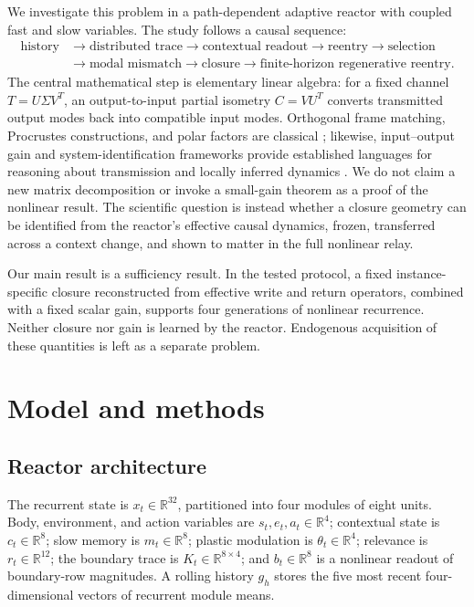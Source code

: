 \documentclass[aps,pre,preprint,superscriptaddress,nofootinbib]{revtex4-2}
\begin{document}
We investigate this problem in a path-dependent adaptive reactor with coupled fast and slow variables. The study follows a causal sequence:
\begin{equation}
\begin{aligned}
\text{history}&\rightarrow\text{distributed trace}\rightarrow\text{contextual readout}\rightarrow\text{reentry}\rightarrow\text{selection}\\
&\rightarrow\text{modal mismatch}\rightarrow\text{closure}\rightarrow\text{finite-horizon regenerative reentry}.
\end{aligned}
\end{equation}
The central mathematical step is elementary linear algebra: for a fixed channel $T=U\Sigma V^T$, an output-to-input partial isometry $C=VU^T$ converts transmitted output modes back into compatible input modes. Orthogonal frame matching, Procrustes constructions, and polar factors are classical \cite{Schonemann1966,Higham1986}; likewise, input--output gain and system-identification frameworks provide established languages for reasoning about transmission and locally inferred dynamics \cite{Zames1966,Ljung1999,Schmid2010}. We do not claim a new matrix decomposition or invoke a small-gain theorem as a proof of the nonlinear result. The scientific question is instead whether a closure geometry can be identified from the reactor's effective causal dynamics, frozen, transferred across a context change, and shown to matter in the full nonlinear relay.

Our main result is a sufficiency result. In the tested protocol, a fixed instance-specific closure reconstructed from effective write and return operators, combined with a fixed scalar gain, supports four generations of nonlinear recurrence. Neither closure nor gain is learned by the reactor. Endogenous acquisition of these quantities is left as a separate problem.

\section{Model and methods}

\subsection{Reactor architecture}

The recurrent state is $x_t\in\mathbb{R}^{32}$, partitioned into four modules of eight units. Body, environment, and action variables are $s_t,e_t,a_t\in\mathbb{R}^{4}$; contextual state is $c_t\in\mathbb{R}^{8}$; slow memory is $m_t\in\mathbb{R}^{8}$; plastic modulation is $\theta_t\in\mathbb{R}^{4}$; relevance is $r_t\in\mathbb{R}^{12}$; the boundary trace is $K_t\in\mathbb{R}^{8\times4}$; and $b_t\in\mathbb{R}^{8}$ is a nonlinear readout of boundary-row magnitudes. A rolling history $g_h$ stores the five most recent four-dimensional vectors of recurrent module means.
\end{document}
